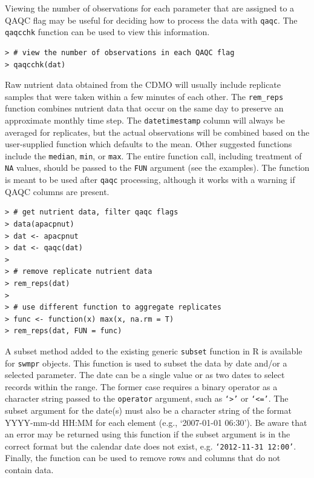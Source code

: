 \documentclass[10pt,letterpaper]{article}\usepackage[]{graphicx}\usepackage[]{color}
\makeatletter
\newenvironment{kframe}{%
 \def\at@end@of@kframe{}%
 \ifinner\ifhmode%
  \def\at@end@of@kframe{\end{minipage}}%
  \begin{minipage}{\columnwidth}%
 \fi\fi%
 \def\FrameCommand##1{\hskip\@totalleftmargin \hskip-\fboxsep
 \colorbox{shadecolor}{##1}\hskip-\fboxsep
     \hskip-\linewidth \hskip-\@totalleftmargin \hskip\columnwidth}%
 \MakeFramed {\advance\hsize-\width
   \@totalleftmargin\z@ \linewidth\hsize
   \@setminipage}}%
 {\par\unskip\endMakeFramed%
 \at@end@of@kframe}
\newenvironment{knitrout}{}{} %
\makeatother
\begin{document}
Viewing the number of observations for each parameter that are assigned to a \gls{QAQC} flag may be useful for deciding how to process the data with \texttt{qaqc}.  The \texttt{qaqcchk} function can be used to view this information.

\begin{knitrout}\small
{}\color{fgcolor}\begin{kframe}
\begin{verbatim}
> # view the number of observations in each QAQC flag
> qaqcchk(dat)
\end{verbatim}
\end{kframe}
\end{knitrout}

Raw nutrient data obtained from the \gls{CDMO} will usually include replicate samples that were taken within a few minutes of each other.  The \texttt{rem\_reps} function combines nutrient data that occur on the same day to preserve an approximate monthly time step.  The \texttt{datetimestamp} column will always be averaged for replicates, but the actual observations will be combined based on the user-supplied function which defaults to the mean.  Other suggested functions include the \texttt{median}, \texttt{min}, or \texttt{max}.  The entire function call, including treatment of \texttt{NA} values, should be passed to the \texttt{FUN} argument (see the examples).  The function is meant to be used after \texttt{qaqc} processing, although it works with a warning if \gls{QAQC} columns are present.

\begin{knitrout}\small
{}\color{fgcolor}\begin{kframe}
\begin{verbatim}
> # get nutrient data, filter qaqc flags
> data(apacpnut)
> dat <- apacpnut
> dat <- qaqc(dat)
> 
> # remove replicate nutrient data
> rem_reps(dat)
> 
> # use different function to aggregate replicates
> func <- function(x) max(x, na.rm = T)
> rem_reps(dat, FUN = func)
\end{verbatim}
\end{kframe}
\end{knitrout}

A subset method added to the existing generic \texttt{subset} function in R is available for \texttt{swmpr} objects.  This function is used to subset the data by date and/or a selected parameter.  The date can be a single value or as two dates to select records within the range. The former case requires a binary operator as a character string passed to the \texttt{operator} argument, such as \texttt{`>'} or \texttt{`<='}.  The subset argument for the date(s) must also be a character string of the format YYYY-mm-dd HH:MM for each element (e.g., `2007-01-01 06:30').  Be aware that an error may be returned using this function if the subset argument is in the correct format but the calendar date does not exist, e.g. \texttt{`2012-11-31 12:00'}.  Finally, the function can be used to remove rows and columns that do not contain data. 
\end{document}
